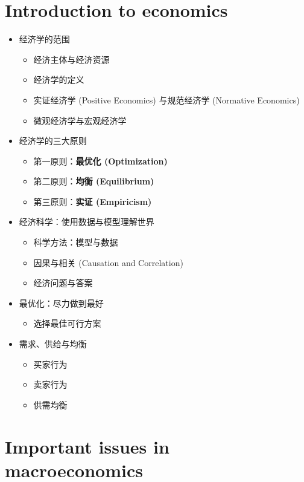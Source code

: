 \section{Introduction to economics}

\begin{itemize}
    \item 经济学的范围
    \begin{itemize}
        \item 经济主体与经济资源
        \item 经济学的定义
        \item 实证经济学 (Positive Economics) 与规范经济学 (Normative Economics)
        \item 微观经济学与宏观经济学
    \end{itemize}
    \item 经济学的三大原则
    \begin{itemize}
        \item 第一原则：\textbf{最优化 (Optimization)}
        \item 第二原则：\textbf{均衡 (Equilibrium)}
        \item 第三原则：\textbf{实证 (Empiricism)}
    \end{itemize}
    \item 经济科学：使用数据与模型理解世界
    \begin{itemize}
        \item 科学方法：模型与数据
        \item 因果与相关 (Causation and Correlation)
        \item 经济问题与答案
    \end{itemize}
    \item 最优化：尽力做到最好
    \begin{itemize}
        \item 选择最佳可行方案
    \end{itemize}
    \item 需求、供给与均衡    
    \begin{itemize}
        \item 买家行为
        \item 卖家行为
        \item 供需均衡
    \end{itemize}
\end{itemize}

\section{Important issues in macroeconomics}


